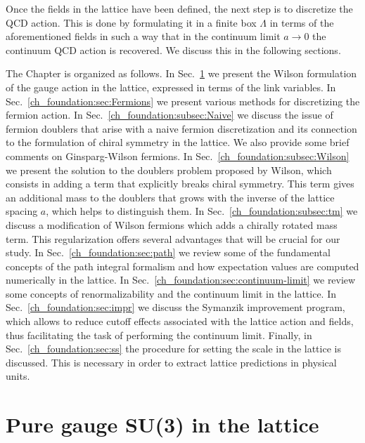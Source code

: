 Once the fields in the lattice have been defined, the next step is to discretize the QCD action. This is done by formulating it in a finite box $\Lambda$ in terms of the aforementioned fields in such a way that in the continuum limit $a\rightarrow 0$ the continuum QCD action is recovered. We discuss this in the following sections.	

The Chapter is organized as follows. In Sec.~\ref{ch_foundation:sec:Gauge} we present the Wilson formulation of the gauge action in the lattice, expressed in terms of the link variables. In Sec.~\ref{ch_foundation:sec:Fermions} we present various methods for discretizing the fermion action. In Sec.~\ref{ch_foundation:subsec:Naive} we discuss the issue of fermion doublers that arise with a naive fermion discretization and its connection to the formulation of chiral symmetry in the lattice. We also provide some brief comments on Ginsparg-Wilson fermions. In Sec.~\ref{ch_foundation:subsec:Wilson} we present the solution to the doublers problem proposed by Wilson, which consists in adding a term that explicitly breaks chiral symmetry. This term gives an additional mass to the doublers that grows with the inverse of the lattice spacing $a$, which helps to distinguish them. In Sec.~\ref{ch_foundation:subsec:tm} we discuss a modification of Wilson fermions which adds a chirally rotated mass term. This regularization offers several advantages that will be crucial for our study. In Sec.~\ref{ch_foundation:sec:path} we review some of the fundamental concepts of the path integral formalism and how expectation values are computed numerically in the lattice. In Sec.~\ref{ch_foundation:sec:continuum-limit} we review some concepts of renormalizability and the continuum limit in the lattice. In Sec.~\ref{ch_foundation:sec:impr} we discuss the Symanzik improvement program, which allows to reduce cutoff effects associated with the lattice action and fields, thus facilitating the task of performing the continuum limit. Finally, in Sec.~\ref{ch_foundation:sec:ss} the procedure for setting the scale in the lattice is discussed. This is necessary in order to extract lattice predictions in physical units.


\section{Pure gauge SU(3) in the lattice}
\label{ch_foundation:sec:Gauge}

